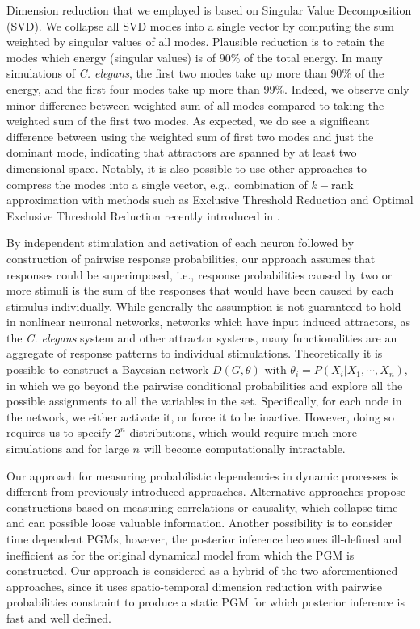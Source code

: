 \documentclass[letterpaper,11pt]{article}
\begin{document}
Dimension reduction that we employed is based on Singular Value Decomposition (SVD). We collapse all SVD modes into a single vector by computing the sum weighted by singular values of all modes. Plausible reduction is to retain the modes which energy (singular values) is of $90\%$ of the total energy. In many simulations of \textit{C. elegans}, the first two modes take up more than $90\%$ of the energy, and the first four modes take up more than $99\%$. Indeed, we observe only minor difference between weighted sum of all modes compared to  taking the weighted sum of the first two modes. As expected, we do see a significant difference between using the weighted sum of first two modes and just the dominant mode, indicating that attractors are spanned by at least two dimensional space. Notably, it is also possible to use other approaches to compress the modes into a single vector, e.g., combination of $k-$rank approximation with methods such as Exclusive Threshold Reduction and Optimal Exclusive Threshold Reduction recently introduced in \cite{OETR}.

By independent stimulation and activation of each neuron followed by construction of pairwise response probabilities, our approach assumes that responses could be superimposed, i.e., response probabilities caused by two or more stimuli is the sum of the responses that would have been caused by each stimulus individually. While generally the assumption is not guaranteed to hold in nonlinear neuronal networks, networks which have input induced attractors, as the \textit{C. elegans} system and other attractor systems, many functionalities are an aggregate of response patterns to individual stimulations. Theoretically it is possible to construct a Bayesian network $D(G,\theta)$ with $\theta_i=P(X_i|X_1, \cdots,X_n)$, in which we go beyond the pairwise conditional probabilities and explore all the possible assignments to all the variables in the set. Specifically, for each node in the network, we either activate it, or force it to be inactive. However, doing so requires us to specify $2^n$ distributions, which would require much more simulations and for large $n$ will become computationally intractable.

Our approach for measuring probabilistic dependencies in dynamic processes is different from previously introduced approaches. Alternative approaches propose constructions based on measuring correlations or causality, which collapse time and can possible loose valuable information. Another possibility is to consider time dependent PGMs, however, the posterior inference becomes ill-defined and inefficient as for the original dynamical model from which the PGM is constructed. Our approach is considered as a hybrid of the two aforementioned approaches, since it uses spatio-temporal dimension reduction with pairwise probabilities constraint to produce a static PGM for which posterior inference is fast and well defined.
\end{document}
